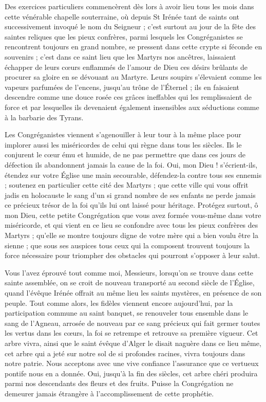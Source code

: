 Des exercices particuliers commencèrent dès lors à avoir lieu tous les mois dans cette vénérable chapelle souterraine, où depuis St Irénée tant de saints ont successivement invoqué le nom du Seigneur ; c'est surtout au jour de la fête des saintes reliques que les pieux confrères, parmi lesquels les Congréganistes se rencontrent toujours en grand nombre, se pressent dans cette crypte si féconde en souvenirs ; c'est dans ce saint lieu que les Martyrs nos ancêtres, laissaient échapper de leurs cœurs enflammés de l'amour de Dieu ces désirs brûlants de procurer sa gloire en se dévouant au Martyre. Leurs soupirs s'élevaient comme les vapeurs parfumées de l'encens, jusqu'au trône de l'Éternel ; ils en faisaient descendre comme une douce rosée ces grâces ineffables qui les remplissaient de force et par
lesquelles ils devenaient également insensibles aux séductions comme à la barbarie des Tyrans.

Les Congréganistes viennent s'agenouiller à leur tour à la même place pour implorer aussi les miséricordes de celui qui règne dans tous les siècles. Ils le conjurent le cœur ému et humide, de ne pas permettre que dans ces jours de défection ils abandonnent jamais la cause de la foi. Oui, mon Dieu ! s'écrient-ils, étendez sur votre Église une main secourable, défendez-la contre tous ses ennemis ; soutenez en particulier cette cité des Martyrs ; que cette ville qui vous offrit jadis en holocauste le sang d'un si grand nombre de ses enfants ne perde jamais ce précieux trésor de la foi qu'ils lui ont laissé pour héritage. Protégez surtout, ô mon Dieu, cette petite Congrégation que vous avez formée vous-même dans votre miséricorde, et qui vient en ce lieu se confondre avec tous les pieux confrères des Martyrs ; qu'elle se montre toujours digne de votre mère qui a bien voulu être la sienne ; que sous ses auspices tous ceux qui la composent trouvent toujours la force nécessaire pour triompher des obstacles qui pourront s'opposer à leur salut.

Vous l'avez éprouvé tout comme moi, Messieurs, lorsqu'on se trouve dans cette sainte assemblée, on se croit de nouveau transporté au second siècle de l'Église, quand l'évêque Irénée offrait au même lieu les saints mystères, en présence de son peuple. Tout comme alors, les fidèles viennent encore aujourd'hui, par la participation commune au saint banquet, se renouveler tous ensemble dans le sang de l'Agneau, arrosée de nouveau par ce sang précieux qui fait germer
toutes les vertus dans les cœurs, la foi se retrempe et retrouve sa première vigueur. Cet arbre vivra, ainsi que le saint évêque d'Alger le disait naguère dans ce lieu même, cet arbre qui a jeté sur notre sol de si profondes racines, vivra toujours dans notre patrie. Nous acceptons avec une vive confiance l'assurance que ce vertueux pontife nous en a donnée. Oui, jusqu'à la fin des siècles, cet arbre chéri produira parmi nos descendants des fleurs et des fruits. Puisse la Congrégation ne demeurer jamais étrangère à l'accomplissement de cette prophétie.


